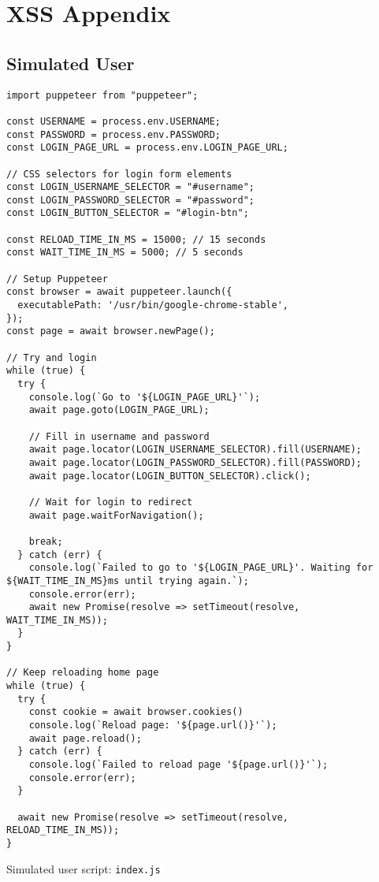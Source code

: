 \section{XSS Appendix}

\subsection{Simulated User}\label{apx:xss-simulated-user}

\begin{verbatim}
import puppeteer from "puppeteer";

const USERNAME = process.env.USERNAME;
const PASSWORD = process.env.PASSWORD;
const LOGIN_PAGE_URL = process.env.LOGIN_PAGE_URL;

// CSS selectors for login form elements
const LOGIN_USERNAME_SELECTOR = "#username";
const LOGIN_PASSWORD_SELECTOR = "#password";
const LOGIN_BUTTON_SELECTOR = "#login-btn";

const RELOAD_TIME_IN_MS = 15000; // 15 seconds
const WAIT_TIME_IN_MS = 5000; // 5 seconds

// Setup Puppeteer
const browser = await puppeteer.launch({
  executablePath: '/usr/bin/google-chrome-stable',
});
const page = await browser.newPage();

// Try and login
while (true) {
  try {
    console.log(`Go to '${LOGIN_PAGE_URL}'`);
    await page.goto(LOGIN_PAGE_URL);

    // Fill in username and password
    await page.locator(LOGIN_USERNAME_SELECTOR).fill(USERNAME);
    await page.locator(LOGIN_PASSWORD_SELECTOR).fill(PASSWORD);
    await page.locator(LOGIN_BUTTON_SELECTOR).click();

    // Wait for login to redirect
    await page.waitForNavigation();

    break;
  } catch (err) {
    console.log(`Failed to go to '${LOGIN_PAGE_URL}'. Waiting for ${WAIT_TIME_IN_MS}ms until trying again.`);
    console.error(err);
    await new Promise(resolve => setTimeout(resolve, WAIT_TIME_IN_MS));
  }
}

// Keep reloading home page
while (true) {
  try {
    const cookie = await browser.cookies()
    console.log(`Reload page: '${page.url()}'`);
    await page.reload();
  } catch (err) {
    console.log(`Failed to reload page '${page.url()}'`);
    console.error(err);
  }

  await new Promise(resolve => setTimeout(resolve, RELOAD_TIME_IN_MS));
}
\end{verbatim}
\begin{listing}[H]
\caption{Simulated user script: \texttt{index.js}}
\end{listing}